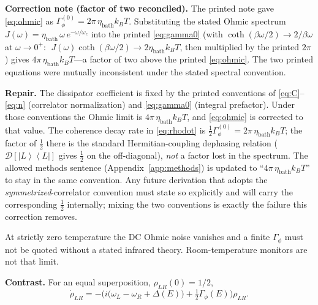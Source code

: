 \documentclass[11pt]{article}
\newenvironment{correction}{%
  \par\medskip
  \begin{lrbox}{\corrsave}%
  \begin{minipage}{\dimexpr\linewidth-2\fboxsep}%
    \small
}{%
  \end{minipage}%
  \end{lrbox}%
  \noindent\fcolorbox{corrrule}{corrback}{\usebox\corrsave}%
  \par\medskip
}
\theoremstyle{definition}
\theoremstyle{plain}
\newcommand{\ket}[1]{\left|{#1}\right\rangle}
\newcommand{\bra}[1]{\left\langle{#1}\right|}
\newcommand{\LR}{\ket{L}\!\bra{L}}
\begin{document}
\begin{correction}
\noindent\textbf{Correction note (factor of two reconciled).}
The printed note gave \eqref{eq:ohmic} as $\Gamma_\phi^{(0)} = 2\pi\, \eta_{\mathrm{bath}} k_B T$.
Substituting the stated Ohmic spectrum $J(\omega) = \eta_{\mathrm{bath}}\,\omega\,e^{-\omega/\omega_c}$
into the printed \eqref{eq:gamma0} (with $\coth(\beta\omega/2) \to 2/\beta\omega$ at $\omega\to0^+$:
$\;J(\omega)\coth(\beta\omega/2) \to 2\eta_{\mathrm{bath}}k_B T$, then multiplied by the printed $2\pi$) gives
$4\pi\,\eta_{\mathrm{bath}} k_B T$---a factor of two above the printed \eqref{eq:ohmic}. The two printed
equations were mutually inconsistent under the stated spectral convention.
\medskip\par\noindent
\textbf{Repair.} The dissipator coefficient is fixed by the printed conventions of \eqref{eq:C}--\eqref{eq:n}
(correlator normalization) and \eqref{eq:gamma0} (integral prefactor). Under those conventions the
Ohmic limit is $4\pi\,\eta_{\mathrm{bath}} k_B T$, and \eqref{eq:ohmic} is corrected to that value. The
coherence decay rate in \eqref{eq:rhodot} is $\tfrac12 \Gamma_\phi^{(0)} = 2\pi\,\eta_{\mathrm{bath}} k_B T$; the
factor of $\tfrac12$ there is the standard Hermitian-coupling dephasing relation
($\mathcal{D}[\LR]$ gives $\tfrac12$ on the off-diagonal), \emph{not} a factor lost in the spectrum. The
allowed methods sentence (Appendix~\ref{app:methods}) is updated to ``$4\pi\,\eta_{\mathrm{bath}} k_BT$'' to
stay in the same convention. Any future derivation that adopts the \emph{symmetrized}-correlator
convention must state so explicitly and will carry the corresponding $\tfrac12$ internally; mixing the
two conventions is exactly the failure this correction removes.
\end{correction}

At strictly zero temperature the DC Ohmic noise vanishes and a finite $\Gamma_\phi$ must not be quoted
without a stated infrared theory. Room-temperature monitors are not that limit.

\textbf{Contrast.} For an equal superposition, $\rho_{LR}(0) = 1/2$,
\begin{equation}
\dot\rho_{LR} = -\Big( i\big( \omega_L - \omega_R + \Delta(E) \big) + \tfrac12 \Gamma_\phi(E) \Big) \rho_{LR}.
\label{eq:rhodot}
\end{equation}
\end{document}
